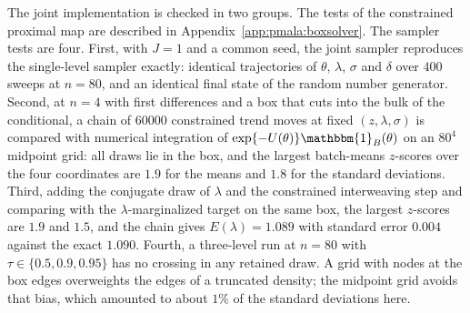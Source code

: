 The joint implementation is checked in two groups. The tests of the constrained proximal map are described in Appendix~\ref{app:pmala:boxsolver}. The sampler tests are four. First, with $J=1$ and a common seed, the joint sampler reproduces the single-level sampler exactly: identical trajectories of $\theta$, $\lambda$, $\sigma$ and $\delta$ over $400$ sweeps at $n = 80$, and an identical final state of the random number generator. Second, at $n=4$ with first differences and a box that cuts into the bulk of the conditional, a chain of $60000$ constrained trend moves at fixed $(z, \lambda, \sigma)$ is compared with numerical integration of $\exp\{-U(\theta)\}\mathbbm{1}_B(\theta)$ on an $80^4$ midpoint grid: all draws lie in the box, and the largest batch-means $z$-scores over the four coordinates are $1.9$ for the means and $1.8$ for the standard deviations. Third, adding the conjugate draw of $\lambda$ and the constrained interweaving step and comparing with the $\lambda$-marginalized target on the same box, the largest $z$-scores are $1.9$ and $1.5$, and the chain gives $E(\lambda) = 1.089$ with standard error $0.004$ against the exact $1.090$. Fourth, a three-level run at $n=80$ with $\tau \in \{0.5, 0.9, 0.95\}$ has no crossing in any retained draw. A grid with nodes at the box edges overweights the edges of a truncated density; the midpoint grid avoids that bias, which amounted to about $1\%$ of the standard deviations here.
